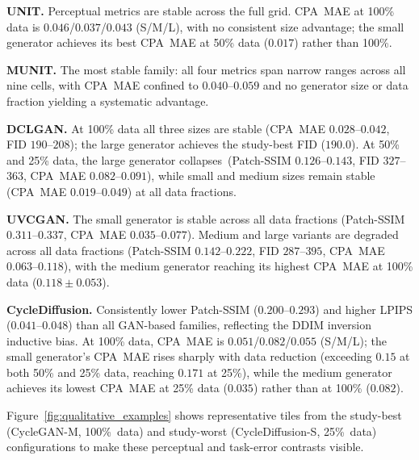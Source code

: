 \noindent\textbf{UNIT.}
Perceptual metrics are stable across the full grid.
CPA~MAE at 100\% data is $0.046$/\allowbreak$0.037$/\allowbreak$0.043$ (S/M/L), with no consistent size
advantage; the small generator achieves its best CPA~MAE at 50\% data ($0.017$) rather
than 100\%.

\noindent\textbf{MUNIT.}
The most stable family: all four metrics span narrow ranges across all nine cells, with
CPA~MAE confined to $0.040$--$0.059$ and no generator size or data fraction yielding a
systematic advantage.

\noindent\textbf{DCLGAN.}
At 100\% data all three sizes are stable (CPA~MAE $0.028$--$0.042$, FID $190$--$208$);
the large generator achieves the study-best FID ($190.0$).
At 50\% and 25\% data, the large generator collapses~(Patch-SSIM $0.126$--$0.143$, FID
$327$--$363$, CPA~MAE $0.082$--$0.091$), while small and medium sizes remain stable
(CPA~MAE $0.019$--$0.049$) at all data fractions.

\noindent\textbf{UVCGAN.}
The small generator is stable across all data fractions (Patch-SSIM $0.311$--$0.337$,
CPA~MAE $0.035$--$0.077$).
Medium and large variants are degraded across all data fractions (Patch-SSIM
$0.142$--$0.222$, FID $287$--$395$, CPA~MAE $0.063$--$0.118$), with the medium
generator reaching its highest CPA~MAE at 100\% data ($0.118 \pm 0.053$).

\noindent\textbf{CycleDiffusion.}
Consistently lower Patch-SSIM ($0.200$--$0.293$) and higher LPIPS ($0.041$--$0.048$)
than all GAN-based families, reflecting the DDIM inversion inductive bias.
At 100\% data, CPA~MAE is $0.051$/\allowbreak$0.082$/\allowbreak$0.055$ (S/M/L); the small generator's
CPA~MAE rises sharply with data reduction (exceeding $0.15$ at both 50\% and 25\% data,
reaching $0.171$ at 25\%), while the medium generator achieves its lowest CPA~MAE at
25\% data ($0.035$) rather than at 100\% ($0.082$).

Figure~\ref{fig:qualitative_examples} shows representative tiles from the study-best
(CycleGAN-M, 100\%~data) and study-worst (CycleDiffusion-S, 25\%~data) configurations
to make these perceptual and task-error contrasts visible.



